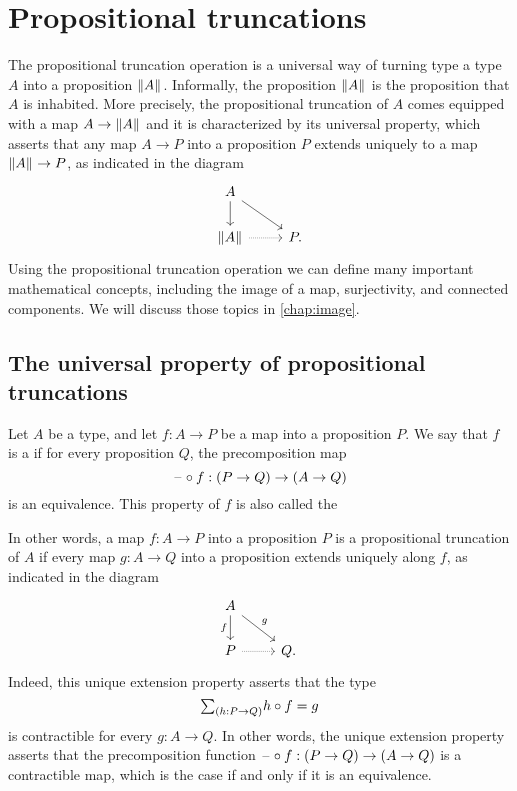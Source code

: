 \section{Propositional truncations}\label{sec:propositional-truncation}

The propositional truncation operation is a universal way of turning type a type $A$ into a proposition $\Vert A\Vert_{}$. Informally, the proposition $\Vert A\Vert_{}$ is the proposition that $A$ is inhabited. More precisely, the propositional truncation of $A$ comes equipped with a map $A\to\Vert A\Vert_{}$ and it is characterized by its universal property, which asserts that any map $A\to P$ into a proposition $P$ extends uniquely to a map $\Vert A\Vert_{}\to P$, as indicated in the diagram
\begin{equation*}
  \begin{tikzcd}
    A \arrow[dr] \arrow[d] \\
    \brck{A} \arrow[r,densely dotted] & P.
  \end{tikzcd}
\end{equation*}
Using the propositional truncation operation we can define many important mathematical concepts, including the image of a map, surjectivity, and connected components. We will discuss those topics in \cref{chap:image}.

\subsection{The universal property of propositional truncations}\label{sec:propositional-truncation-up}

\begin{defn}
Let $A$ be a type, and let $f:A\to P$ be a map into a proposition $P$. We say that $f$ is a  if for every proposition $Q$, the precomposition map
\begin{equation*}
\mathord{\hspace{1pt}\text{--}\hspace{1pt}}\circ f:(P\to Q)\to (A\to Q)
\end{equation*}
is an equivalence. This property of $f$ is also called the 
\end{defn}

In other words, a map $f:A\to P$ into a proposition $P$ is a propositional truncation of $A$ if every map $g:A\to Q$ into a proposition extends uniquely along $f$, as indicated in the diagram
\begin{equation*}
  \begin{tikzcd}
    A \arrow[d,swap,"f"] \arrow[dr,"g"] \\
    P \arrow[r,densely dotted] & Q.
  \end{tikzcd}
\end{equation*}
Indeed, this unique extension property asserts that the type
\begin{equation*}
  \sm{h:P\to Q}h\circ f=g
\end{equation*}
is contractible for every $g:A\to Q$. In other words, the unique extension property asserts that the precomposition function $\mathord{\hspace{1pt}\text{--}\hspace{1pt}}\circ f:(P\to Q)\to (A\to Q)$ is a contractible map, which is the case if and only if it is an equivalence.

